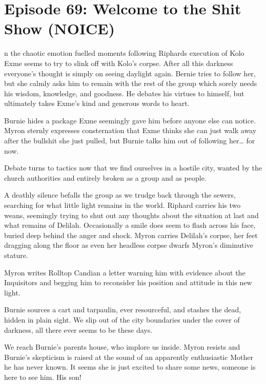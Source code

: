 \section{Episode 69: Welcome to the Shit Show (NOICE)}

\medskip

n the chaotic emotion fuelled moments following Riphards execution of Kolo Exme seems to try to slink off with Kolo’s corpse. After all this darkness everyone’s thought is simply on seeing daylight again. Bernie tries to follow her, but she calmly asks him to remain with the rest of the group which sorely needs his wisdom, knowledge, and goodness. He debates his virtues to himself, but ultimately takes Exme’s kind and generous words to heart.\medskip

Burnie hides a package Exme seemingly gave him before anyone else can notice. Myron sternly expresses consternation that Exme thinks she can just walk away after the bullshit she just pulled, but Burnie talks him out of following her… for now.\medskip

Debate turns to tactics now that we find ourselves in a hostile city, wanted by the church authorities and entirely broken as a group and as people.\medskip

A deathly silence befalls the group as we trudge back through the sewers, searching for what little light remains in the world. Riphard carries his two weans, seemingly trying to shut out any thoughts about the situation at last and what remains of Delilah. Occasionally a smile does seem to flash across his face, buried deep behind the anger and shock. Myron carries Delilah’s corpse, her feet dragging along the floor as even her headless corpse dwarfs Myron’s diminutive stature.\medskip

Myron writes Rolltop Candian a letter warning him with evidence about the Inquisitors and begging him to reconsider his position and attitude in this new light.\medskip

Burnie sources a cart and tarpaulin, ever resourceful, and stashes the dead, hidden in plain sight. We slip out of the city boundaries under the cover of darkness, all there ever seems to be these days.\medskip

We reach Burnie’s parents house, who implore us inside. Myron resists and Burnie’s skepticism is raised at the sound of an apparently enthusiastic Mother he has never known. It seems she is just excited to share some news, someone is here to see him. His son!\medskip


